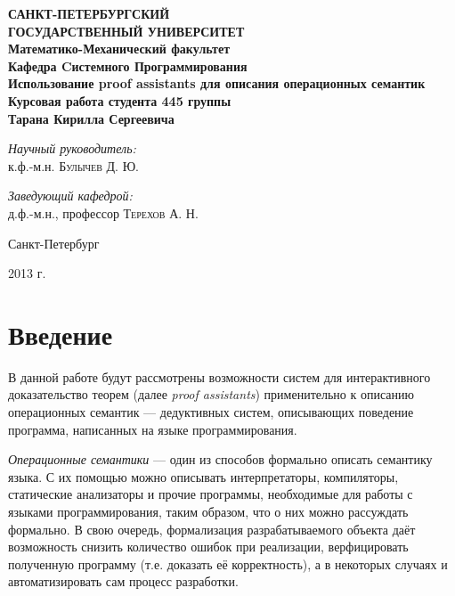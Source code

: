 \documentclass[aps,12pt,final,oneside,onecolumn,musixtex,superscriptaddress,centertags]{article}
\begin{document}
\sloppy

  \begin{titlepage} 
     \begin{center}
        \textbf{\Large САНКТ-ПЕТЕРБУРГСКИЙ \\ ГОСУДАРСТВЕННЫЙ УНИВЕРСИТЕТ} \\[1.0cm]
        \textbf{\large Математико-Механический факультет} \\[0.2cm]
        \textbf{\large Кафедра Cистемного Программирования}\\[3.5cm]

        \textbf{\LARGE Использование proof assistants для описания операционных семантик}\\[1.0cm]
        \textbf{\Large Курсовая работа студента 445 группы} \\[0.2cm]
        \textbf{\Large Тарана Кирилла Сергеевича} \\[3.5cm]

        \begin{flushright} \large \emph{Научный руководитель:} \\ к.ф.-м.н. \textsc{Булычев Д. Ю.} \end{flushright}
        \begin{flushright} \large \emph{Заведующий кафедрой:}  \\ д.ф.-м.н., профессор \textsc{Терехов А. Н.} \end{flushright}
        \vfill 

        {\large {Санкт-Петербург}} \par
        {\large {2013 г.}}
     \end{center} 
  \end{titlepage}

  \tableofcontents
  \newpage

  \section*{Введение}

     В данной работе будут рассмотрены возможности систем для интерактивного доказательство теорем (далее \emph{proof assistants}) применительно к описанию операционных семантик --- дедуктивных систем, описывающих поведение программа, написанных на языке программирования.

     \emph{Операционные семантики} --- один из способов формально описать семантику языка. С их помощью можно описывать интерпретаторы, компиляторы, статические анализаторы и прочие программы, необходимые для работы с языками программирования, таким образом, что о них можно рассуждать формально. В свою очередь, формализация разрабатываемого объекта даёт возможность снизить количество ошибок при реализации, верфицировать полученную программу (т.е. доказать её корректность), а в некоторых случаях и автоматизировать сам процесс разработки.
\end{document}
